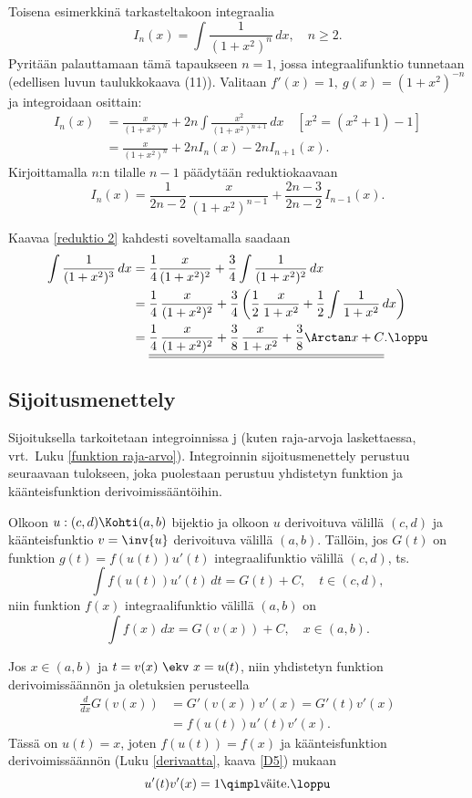 Toisena esimerkkinä tarkasteltakoon integraalia
\[
I_n(x)=\int\frac{1}{(1+x^2)^n}\,dx,\quad n \ge 2.
\]
Pyritään palauttamaan tämä tapaukseen $n=1$, jossa integraalifunktio tunnetaan (edellisen
luvun taulukkokaava (11)). Valitaan $f'(x)=1,\ g(x)=(1+x^2)^{-n}$ ja integroidaan osittain:
\begin{align*}
I_n(x) &= \frac{x}{(1+x^2)^n}+2n\int\frac{x^2}{(1+x^2)^{n+1}}\, dx \quad [x^2=(x^2+1)-1] \\
&= \frac{x}{(1+x^2)^n}+2n I_n(x) - 2n I_{n+1}(x).
\end{align*}
Kirjoittamalla $n$:n tilalle $n-1$ päädytään reduktiokaavaan
\begin{equation} \label{reduktio 2}
I_n(x)=\frac{1}{2n-2}\,\frac{x}{(1+x^2)^{n-1}}+\frac{2n-3}{2n-2}\,I_{n-1}(x).
\end{equation}
\begin{Exa}
Kaavaa \eqref{reduktio 2} kahdesti soveltamalla saadaan
\begin{align*}
\int\frac{1}{(1+x^2)^3}\,dx 
&= \frac{1}{4}\frac{x}{(1+x^2)^2}+\frac{3}{4}\int\frac{1}{(1+x^2)^2}\,dx \\
&= \frac{1}{4}\,\frac{x}{(1+x^2)^2}+\frac{3}{4}
        \left(\frac{1}{2}\,\frac{x}{1+x^2}+\frac{1}{2}\int \frac{1}{1+x^2}\,dx\right) \\
&= \underline{\underline{\frac{1}{4}\,
         \frac{x}{(1+x^2)^2}+\frac{3}{8}\,\frac{x}{1+x^2}+\frac{3}{8}\Arctan x+C}}. \loppu
\end{align*}
\end{Exa}

\subsection*{Sijoitusmenettely}

Sijoituksella tarkoitetaan integroinnissa j 
(kuten raja-arvoja laskettaessa, vrt.\ Luku \ref{funktion raja-arvo}). Integroinnin 
sijoitusmenettely perustuu seuraavaan tulokseen, joka puolestaan perustuu yhdistetyn funktion
ja käänteisfunktion derivoimissääntöihin.
\begin{Prop} \label{sijoituspropositio}
Olkoon $u:(c,d)\Kohti (a,b)$ bijektio ja olkoon $u$ derivoituva välillä $(c,d)$ ja
käänteisfunktio $v=\inv{u}$ derivoituva välillä $(a,b)$. Tällöin, jos $G(t)$ on funktion
$g(t)=f(u(t))u'(t)$ integraalifunktio välillä $(c,d)$, ts.\
\[
\int f(u(t))u'(t)\, dt=G(t)+C,\quad t\in (c,d),
\]
niin funktion $f(x)$ integraalifunktio välillä $(a,b)$ on
\[
\int f(x)\, dx=G(v(x))+C,\quad x\in (a,b).
\]
\end{Prop}
\tod Jos $x\in (a,b)$ ja $t=v(x) \ \ekv \ x=u(t)$, niin yhdistetyn funktion derivoimissäännön
ja oletuksien perusteella
\begin{align*}
\frac{d}{dx}G(v(x)) &= G'(v(x))v'(x)=G'(t)v'(x) \\
&= f(u(t))u'(t)v'(x).
\end{align*}
Tässä on $u(t)=x$, joten $f(u(t))=f(x)$ ja käänteisfunktion derivoimissäännön
(Luku \ref{derivaatta}, kaava \eqref{D5}) mukaan
\[ 
u'(t)v'(x)=1 \qimpl \text{väite}. \loppu 
\]

